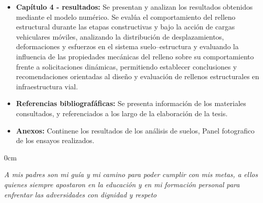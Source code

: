\begin{itemize}
	
	\item \textbf{Capítulo 4 - resultados:} Se presentan y analizan los resultados obtenidos mediante el modelo numérico. Se evalúa el comportamiento del relleno estructural durante las etapas constructivas y bajo la acción de cargas vehiculares móviles, analizando la distribución de desplazamientos, deformaciones y esfuerzos en el sistema suelo–estructura  y evaluando la influencia de las propiedades mecánicas del relleno sobre su comportamiento frente a solicitaciones dinámicas, permitiendo establecer conclusiones y recomendaciones orientadas al diseño y evaluación de rellenos estructurales en infraestructura vial.
	
	
	
	
	\item \textbf{Referencias bibliografáficas:} Se presenta información de los materiales consultados, y referenciados a los largo de la elaboración de la tesis.
	
	
	\item \textbf{Anexos:} Continene los resultados de los análisis de suelos, Panel fotografico de los ensayos realizados.
\end{itemize}




\vspace*{4.5cm}

\begin{hspace}{0cm}
	\begin{minipage}{10cm}
		\emph{A mis padres son mi guía y mi camino para poder cumplir con mis metas, a ellos quienes siempre apostaron en la educación y en mi formación personal para enfrentar las adversidades con dignidad y respeto}
	\end{minipage}
\end{hspace}

